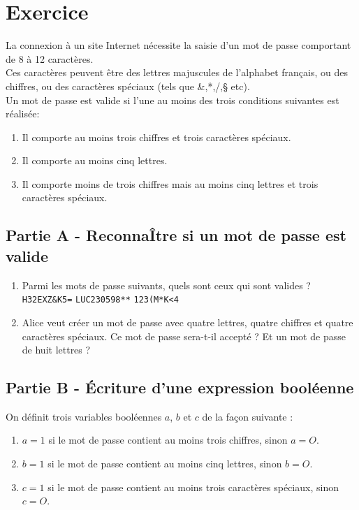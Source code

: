 \documentclass[a4paper,12pt]{article}
\begin{document}
\section*{Exercice}

La connexion à un site Internet nécessite la saisie d'un mot de passe comportant de
8 à 12 caractères.\\
 Ces caractères peuvent être des lettres majuscules de l'alphabet
français, ou des chiffres, ou des caractères spéciaux (tels que \&,*,/,§ etc).\\
Un mot de passe est valide si l'une au moins des trois conditions suivantes est
réalisée:
\begin{enumerate}[--]
    \item 	Il comporte au moins trois chiffres et trois caractères spéciaux.
    \item 	Il comporte au moins cinq lettres.
    \item 	Il comporte moins de trois chiffres mais au moins cinq lettres et trois caractères
    spéciaux.
\end{enumerate}
\subsection*{Partie A - ReconnaÎtre si un mot de passe est valide}

\begin{enumerate}[\bfseries 1.]
    \item 	 Parmi les mots de passe suivants, quels sont ceux qui sont valides ?\\

    \texttt{H32EXZ\&K5=}\hspace{6em}  \texttt{LUC230598**}\hspace{6em} \texttt{123(M*K<4}
    \item 	 	Alice veut créer un mot de passe avec quatre lettres, quatre chiffres et quatre
    caractères spéciaux. Ce mot de passe sera-t-il accepté ? Et un mot de passe de huit
    lettres ?
\end{enumerate}

\subsection*{Partie B - Écriture d'une expression booléenne}

On définit trois variables booléennes $a$, $b$ et $c$ de la façon suivante :
\begin{enumerate}[--]
    \item 	$a = 1$ si le mot de passe contient au moins trois chiffres, sinon $a = O$.
    \item 	$b = 1$ si le mot de passe contient au moins cinq lettres, sinon $b = O$.
    \item 	$c = 1$ si le mot de passe contient au moins trois caractères spéciaux, sinon $c = O$.
\end{enumerate}
\end{document}
